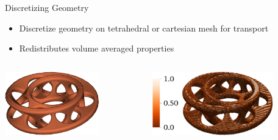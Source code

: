 \documentclass[xcolor=x11names,compress]{beamer}
\renewcommand{\(}{\begin{columns}}
\renewcommand{\)}{\end{columns}}
\newcommand{\<}[1]{\begin{column}{#1}}
\renewcommand{\>}{\end{column}}
\begin{document}
\begin{frame}{Discretizing Geometry}
    \begin{itemize}
        \item Discretize geometry on tetrahedral or cartesian mesh for transport
        \item Redistributes volume averaged properties
    \end{itemize}
    \begin{columns}
        \begin{column}{0.45\textwidth}
            \includegraphics[height=1.1in,clip]{mobius_cad.png}  
  	    \end{column}
 	    \begin{column}{0.45\textwidth}
            \includegraphics[height=1.1in,clip]{mobius_mesh.png}  
        \end{column}
    \end{columns}
\end{frame}
\end{document}
